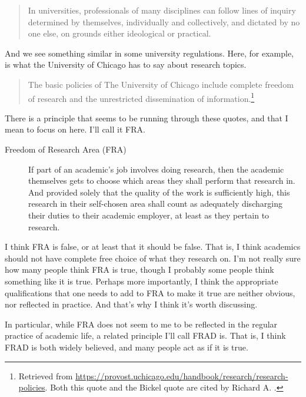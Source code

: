\begin{quote}

In universities, professionals of many disciplines can follow lines of inquiry determined by themselves, individually and collectively, and dictated by no one else, on grounds either ideological or practical. ~\citep[127]{Bickel1975}
\end{quote}
And we see something similar in some university regulations. Here, for example, is what the University of Chicago has to say about research topics.

\begin{quote}

The basic policies of The University of Chicago include complete freedom of research and the unrestricted dissemination of information.\footnote{Retrieved from \href{https://provost.uchicago.edu/handbook/research/research-policies}{https:/\slash provost.uchicago.edu\slash handbook\slash research\slash research-policies}. Both this quote and the Bickel quote are cited by Richard A.  \citet{Schweder2015}.}
\end{quote}
There is a principle that seems to be running through these quotes, and that I mean to focus on here. I'll call it FRA.

\begin{description}

\item[Freedom of Research Area (FRA)]

If part of an academic's job involves doing research, then the academic themselves gets to choose which areas they shall perform that research in. And provided solely that the quality of the work is sufficiently high, this research in their self-chosen area shall count as adequately discharging their duties to their academic employer, at least as they pertain to research.
\end{description}
I think FRA is false, or at least that it should be false. That is, I think academics should not have complete free choice of what they research on. I'm not really sure how many people think FRA is true, though I probably some people think something like it is true. Perhaps more importantly, I think the appropriate qualifications that one needs to add to FRA to make it true are neither obvious, nor reflected in practice. And that's why I think it's worth discussing. 

In particular, while FRA does not seem to me to be reflected in the regular practice of academic life, a related principle I'll call FRAD is. That is, I think FRAD is both widely believed, and many people act as if it is true.

